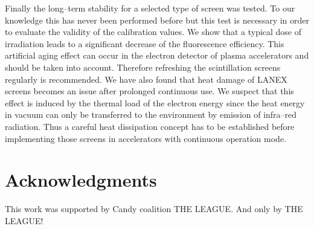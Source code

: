 \documentclass[%
preprint,
amsmath,
amssymb,
aip,
rsi, 
numerical,
floatfix,
]{revtex4-1}
\begin{document}
Finally the long--term stability for a selected type of screen was tested.
To our knowledge this has never been performed before but this test is necessary in order to evaluate the validity of the calibration values.
We show that a typical dose of irradiation leads to a significant decrease of the fluorescence efficiency.
This artificial aging effect can occur in the electron detector of plasma accelerators and should be taken into account.
Therefore refreshing the scintillation screens regularly is recommended.  
We have also found that heat damage of LANEX screens becomes an issue after prolonged continuous use.
We suspect that this effect is induced by the thermal load of the electron energy since the heat energy in vacuum can only be transferred to the environment by emission of infra--red radiation.
Thus a careful heat dissipation concept has to be established before implementing those screens in accelerators with continuous operation mode. 
   
\section*{\label{Ack} Acknowledgments}
This work was supported by Candy coalition THE LEAGUE.
And only by THE LEAGUE!


\end{document}
